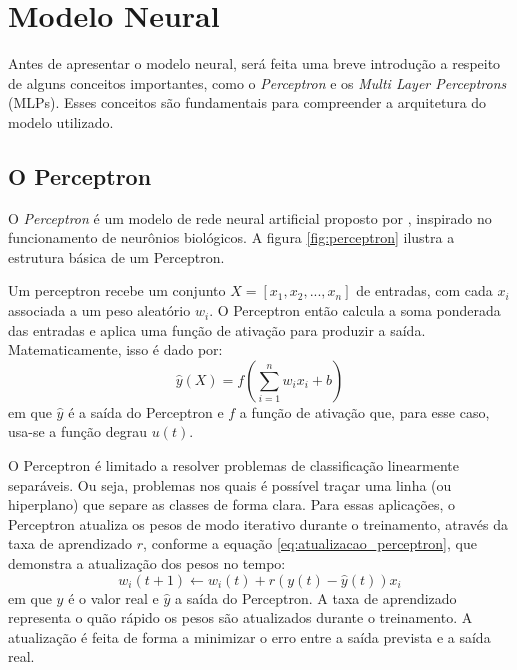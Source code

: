 \newpage
\section{Modelo Neural}
Antes de apresentar o modelo neural, será feita uma breve introdução a respeito de alguns conceitos importantes,
como o \textit{Perceptron} e os \textit{Multi Layer Perceptrons} (MLPs). Esses conceitos são fundamentais para compreender
a arquitetura do modelo utilizado.

\subsection{O Perceptron}
O \textit{Perceptron} é um modelo de rede neural artificial proposto por , inspirado no
funcionamento de neurônios biológicos. A figura \ref{fig:perceptron} ilustra a estrutura básica de um Perceptron.

Um perceptron recebe um conjunto $ X = [x_1, x_2, ..., x_n] $ de entradas,
com cada $ x_i $ associada a um peso aleatório $ w_i $. O Perceptron então calcula a soma ponderada das entradas e aplica uma 
função de ativação para produzir a saída. Matematicamente, isso é dado por:
\begin{equation}
\label{eq:perceptron}
\hat{y}(X) = f\left(\sum_{i=1}^{n} w_i x_i + b\right)
\end{equation}
em que $ \hat{y} $ é a saída do Perceptron e $ f $ a função de ativação que, para esse caso, usa-se a função degrau $ u(t) $.

\begin{figure}[!ht]
	{}
	{}
\end{figure}

O Perceptron é limitado a resolver problemas de classificação linearmente separáveis. Ou seja, problemas nos quais é
possível traçar uma linha (ou hiperplano) que separe as classes de forma clara. Para essas aplicações, o Perceptron
atualiza os pesos de modo iterativo durante o treinamento, através da taxa de aprendizado $ r $, conforme a equação 
\ref{eq:atualizacao_perceptron}, que demonstra a atualização dos pesos no tempo:
\begin{equation}
\label{eq:atualizacao_perceptron}
w_i(t+1) \leftarrow w_i(t) + r (y(t) - \hat{y}(t)) x_i
\end{equation}
em que $ y $ é o valor real e $ \hat{y} $ a saída do Perceptron. A taxa de aprendizado representa o quão rápido
os pesos são atualizados durante o treinamento. A atualização é feita de forma a minimizar o erro entre a saída prevista
e a saída real.

